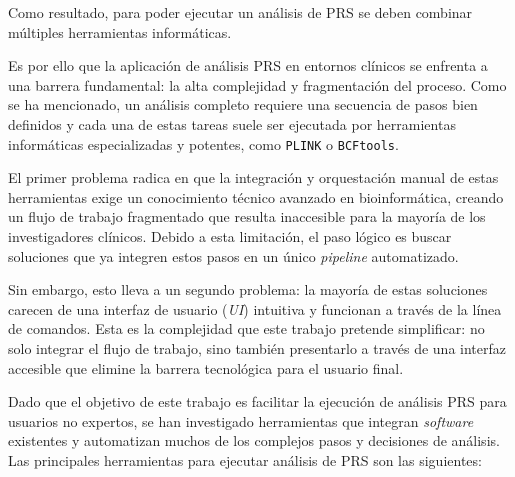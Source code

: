 Como resultado, para poder ejecutar un análisis de PRS se deben combinar múltiples herramientas informáticas.

Es por ello que la aplicación de análisis PRS en entornos clínicos se enfrenta a una barrera fundamental: la alta complejidad y fragmentación del proceso. Como se ha mencionado, un análisis completo requiere una secuencia de pasos bien definidos y cada una de estas tareas suele ser ejecutada por herramientas informáticas especializadas y potentes, como \texttt{PLINK} o \texttt{BCFtools}. 

El primer problema radica en que la integración y orquestación manual de estas herramientas exige un conocimiento técnico avanzado en bioinformática, creando un flujo de trabajo fragmentado que resulta inaccesible para la mayoría de los investigadores clínicos. Debido a esta limitación, el paso lógico es buscar soluciones que ya integren estos pasos en un único \textit{pipeline} automatizado. 

Sin embargo, esto lleva a un segundo problema: la mayoría de estas soluciones carecen de una interfaz de usuario (\textit{UI}) intuitiva y funcionan a través de la línea de comandos. Esta es la complejidad que este trabajo pretende simplificar: no solo integrar el flujo de trabajo, sino también presentarlo a través de una interfaz accesible que elimine la barrera tecnológica para el usuario final.

Dado que el objetivo de este trabajo es facilitar la ejecución de análisis PRS para usuarios no expertos, se han investigado herramientas que integran \textit{software} existentes y automatizan muchos de los complejos pasos y decisiones de análisis.
Las principales herramientas para ejecutar análisis de PRS son las siguientes:

